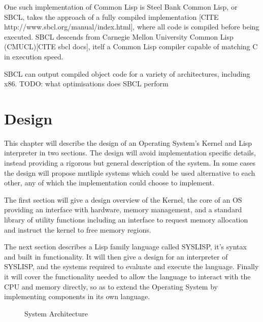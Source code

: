 \documentclass[11pt]{report}
\begin{document}
One such implementation of Common Lisp is Steel Bank Common Lisp, or SBCL, takes the approach of a fully compiled implementation [CITE http://www.sbcl.org/manual/index.html], where all code is compiled before being executed. SBCL descends from Carnegie Mellon University Common Lisp (CMUCL)[CITE sbcl docs], itelf a Common Lisp compiler capable of matching C in execution speed\cite{verna2006make}.

SBCL can output compiled object code for a variety of architectures, including x86. 
TODO: what optimisations does SBCL perform

\chapter{Design}
This chapter will describe the design of an Operating System's Kernel and Lisp interpreter in two sections. The design will avoid implementation specific details, instead providing a rigorous but general description of the system. In some cases the design will propose mutliple systems which could be used alternative to each other, any of which the implementation could choose to implement.

The first section will give a design overview of the Kernel, the core of an OS providing an interface with hardware, memory management, and a standard library of utility functions including an interface to request memory allocation and instruct the kernel to free memory regions.

The next section describes a Lisp family language called SYSLISP, it's syntax and built in functionality. It will then give a design for an interpreter of SYSLISP, and the systems required to evaluate and execute the language. Finally it will cover the functionality needed to allow the language to interact with the CPU and memory directly, so as to extend the Operating System by implementing components in its own language.

\begin{figure}[h]
  \centering
  \caption{System Architecture}
  \label{sysarch}
\end{figure}
\end{document}
